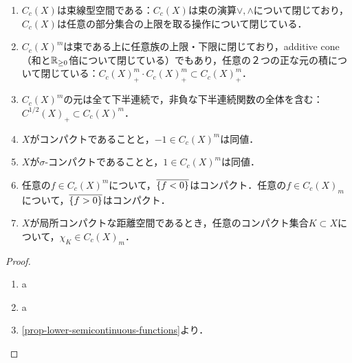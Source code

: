 \documentclass[uplatex,dvipdfmx]{jsreport}
\begin{document}
\begin{lemma}\mbox{}
    \begin{enumerate}
        \item $C_c(X)$は束線型空間である：$C_c(X)$は束の演算$\lor,\land$について閉じており，$C_c(X)$は任意の部分集合の上限を取る操作について閉じている．
        \item $C_c(X)^m$は束である上に任意族の上限・下限に閉じており，additive cone（和と$\mathbb{R}_{\ge 0}$倍について閉じている）でもあり，任意の２つの正な元の積について閉じている：$C_c(X)^m_+\cdot C_c(X)^m_+\subset C_c(X)^m_+$．
        \item $C_c(X)^m$の元は全て下半連続で，非負な下半連続関数の全体を含む：$C^{1/2}(X)_+\subset C_c(X)^m$．
        \item $X$がコンパクトであることと，$-1\in C_c(X)^m$は同値．
        \item $X$が$\sigma$-コンパクトであることと，$1\in C_c(X)^m$は同値．
        \item 任意の$f\in C_c(X)^m$について，$\overline{\left\{f<0\right\}}$はコンパクト．任意の$f\in C_c(X)_m$について，$\overline{\left\{f>0\right\}}$はコンパクト．
        \item $X$が局所コンパクトな距離空間であるとき，任意のコンパクト集合$K\subset X$について，$\chi_K\in C_c(X)_m$．
    \end{enumerate}
\end{lemma}
\begin{proof}\mbox{}
    \begin{enumerate}
        \item a
        \item a
        \item \ref{prop-lower-semicontinuous-functions}より．
    \end{enumerate}
\end{proof}
\end{document}
